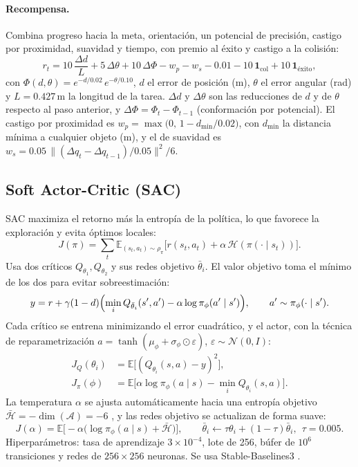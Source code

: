 \documentclass[11pt,a4paper,twoside]{article}
\newcommand{\E}{\mathbb{E}}
\newcommand{\ind}{\mathbf{1}}
\begin{document}
\paragraph{Recompensa.} Combina progreso hacia la meta, orientación, un potencial de precisión, castigo por proximidad, suavidad y tiempo, con premio al éxito y castigo a la colisión:
\begin{equation}
r_t = 10\,\frac{\Delta d}{L}+5\,\Delta\theta+10\,\Delta\Phi-w_p-w_s-0.01-10\,\ind_{\mathrm{col}}+10\,\ind_{\mathrm{éxito}},
\end{equation}
con $\Phi(d,\theta)=e^{-d/0.02}\,e^{-\theta/0.10}$, $d$ el error de posición (m), $\theta$ el error angular (rad) y $L=0.427$\,m la longitud de la tarea. $\Delta d$ y $\Delta\theta$ son las reducciones de $d$ y de $\theta$ respecto al paso anterior, y $\Delta\Phi=\Phi_t-\Phi_{t-1}$ (conformación por potencial). El castigo por proximidad es $w_p=\max\!\bigl(0,\,1-d_{\min}/0.02\bigr)$, con $d_{\min}$ la distancia mínima a cualquier objeto (m), y el de suavidad es $w_s=0.05\,\lVert(\Delta q_t-\Delta q_{t-1})/0.05\rVert^2/6$.

\subsection{Soft Actor-Critic (SAC)}

SAC \cite{haarnoja2018} maximiza el retorno más la entropía de la política, lo que favorece la exploración y evita óptimos locales:
\begin{equation}
J(\pi)=\sum_{t}\E_{(s_t,a_t)\sim\rho_\pi}\bigl[r(s_t,a_t)+\alpha\,\mathcal{H}(\pi(\cdot\mid s_t))\bigr].
\end{equation}
Usa dos críticos $Q_{\theta_1},Q_{\theta_2}$ y sus redes objetivo $\bar\theta_i$. El valor objetivo toma el mínimo de los dos para evitar sobreestimación:
\begin{equation}
y=r+\gamma(1-d)\Bigl(\min_{i}Q_{\bar\theta_i}(s',a')-\alpha\log\pi_\phi(a'\mid s')\Bigr),\qquad a'\sim\pi_\phi(\cdot\mid s').
\end{equation}
Cada crítico se entrena minimizando el error cuadrático, y el actor, con la técnica de reparametrización $a=\tanh(\mu_\phi+\sigma_\phi\odot\varepsilon)$, $\varepsilon\sim\mathcal{N}(0,I)$:
\begin{align}
J_Q(\theta_i)&=\E\bigl[(Q_{\theta_i}(s,a)-y)^2\bigr],\\
J_\pi(\phi)&=\E\bigl[\alpha\log\pi_\phi(a\mid s)-\min_i Q_{\theta_i}(s,a)\bigr].
\end{align}
La temperatura $\alpha$ se ajusta automáticamente hacia una entropía objetivo $\bar{\mathcal{H}}=-\dim(\mathcal{A})=-6$ \cite{haarnoja2018b}, y las redes objetivo se actualizan de forma suave:
\begin{equation}
J(\alpha)=\E\bigl[-\alpha\bigl(\log\pi_\phi(a\mid s)+\bar{\mathcal{H}}\bigr)\bigr],\qquad
\bar\theta_i\leftarrow\tau\theta_i+(1-\tau)\bar\theta_i,\ \ \tau=0.005 .
\end{equation}
Hiperparámetros: tasa de aprendizaje $3\times10^{-4}$, lote de 256, búfer de $10^6$ transiciones y redes de $256\times256$ neuronas. Se usa Stable-Baselines3 \cite{sb3}.
\end{document}
